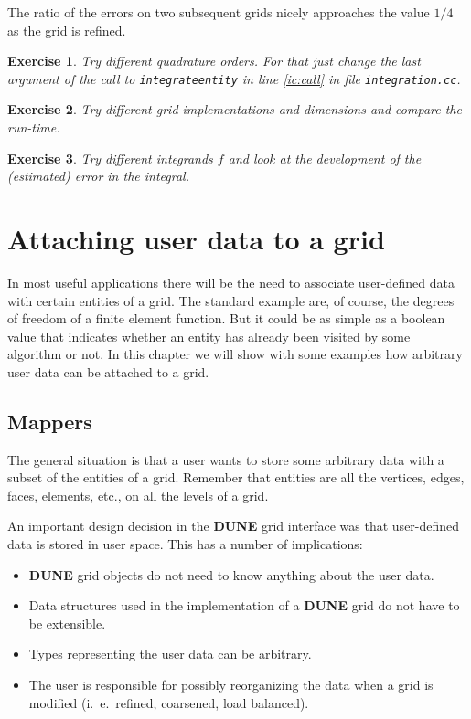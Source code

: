 \documentclass[11pt,a4paper,headinclude,footinclude,DIV16,normalheadings]{scrreprt}
\newcommand{\Dune}{{\sf\bfseries DUNE}}
\newtheorem{exc}{Exercise}[chapter]
\begin{document}
The ratio of the errors on two subsequent grids nicely approaches the
value $1/4$ as the grid is refined.


\begin{exc} Try different quadrature orders. For that just change the
  last argument of the call to \lstinline!integrateentity! in line
  \ref{ic:call} in file \lstinline!integration.cc!.
\end{exc}

\begin{exc} Try different grid implementations and dimensions and
  compare the run-time.
\end{exc}

\begin{exc} Try different integrands $f$ and look at the development
  of the (estimated) error in the integral. 
\end{exc}

\chapter{Attaching user data to a grid}

In most useful applications there will be the need to associate
user-defined data with certain entities of a grid. The standard
example are, of course, the degrees of freedom of a finite element
function. But it could be as simple as a boolean value that indicates
whether an entity has already been visited by some algorithm or
not. In this chapter we will show with some examples how arbitrary
user data can be attached to a grid.

\section{Mappers}

The general situation is that a user wants to store some arbitrary
data with a subset of the entities of a grid. Remember that entities
are all the vertices, edges, faces, elements, etc., on all the levels
of a grid.

An important design decision in the \Dune{} grid interface was that
user-defined data is stored in user space. This has a number of
implications:
\begin{itemize}
\item \Dune{} grid objects do not need to know anything about the user
  data.
\item Data structures used in the implementation of a \Dune{} grid do
  not have to be extensible.
\item Types representing the user data can be arbitrary.
\item The user is responsible for possibly reorganizing the data when
  a grid is modified (i.~e.~refined, coarsened, load balanced).
\end{itemize}
\end{document}
